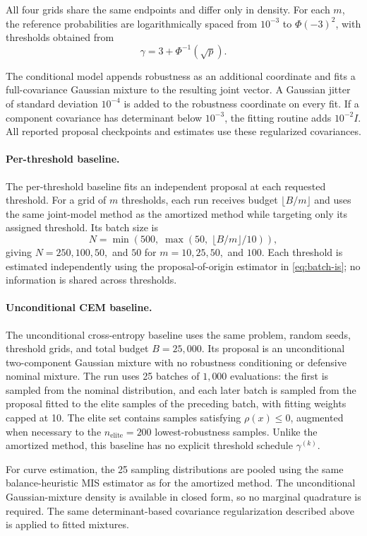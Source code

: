 All four grids share the same endpoints and differ only in density. For each $m$, the reference probabilities are logarithmically spaced from $10^{-3}$ to $\Phi(-3)^2$, with thresholds obtained from
\[
    \gamma
    =
    3+\Phi^{-1}\!\left(\sqrt{p}\right).
\]

The conditional model appends robustness as an additional coordinate and fits a full-covariance Gaussian mixture to the resulting joint vector. A Gaussian jitter of standard deviation $10^{-4}$ is added to the robustness coordinate on every fit. If a component covariance has determinant below $10^{-3}$, the fitting routine adds $10^{-2}I$. All reported proposal checkpoints and estimates use these regularized covariances.

\paragraph{Per-threshold baseline.}
The per-threshold baseline fits an independent proposal at each requested threshold. For a grid of $m$ thresholds, each run receives budget $\lfloor B/m\rfloor$ and uses the same joint-model method as the amortized method while targeting only its assigned threshold. Its batch size is
\[
    N
    =
    \min\!\left(
        500,\;
        \max\!\left(50,\;\lfloor B/m\rfloor/10\right)
    \right),
\]
giving $N=250,100,50,$ and $50$ for $m=10,25,50,$ and $100$. Each threshold is estimated independently using the proposal-of-origin estimator in \cref{eq:batch-is}; no information is shared across thresholds.

\paragraph{Unconditional CEM baseline.}
The unconditional cross-entropy baseline uses the same problem, random seeds, threshold grids, and total budget $B=25{,}000$. Its proposal is an unconditional two-component Gaussian mixture with no robustness conditioning or defensive nominal mixture. The run uses 25 batches of $1{,}000$ evaluations: the first is sampled from the nominal distribution, and each later batch is sampled from the proposal fitted to the elite samples of the preceding batch, with fitting weights capped at 10. The elite set contains samples satisfying $\rho(x)\leq0$, augmented when necessary to the $n_{\mathrm{elite}}=200$ lowest-robustness samples. Unlike the amortized method, this baseline has no explicit threshold schedule $\gamma^{(k)}$.

For curve estimation, the 25 sampling distributions are pooled using the same balance-heuristic MIS estimator as for the amortized method. The unconditional Gaussian-mixture density is available in closed form, so no marginal quadrature is required. The same determinant-based covariance regularization described above is applied to fitted mixtures.

